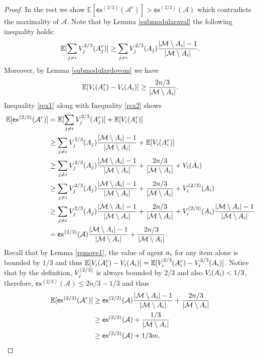 \begin{proof}
	In the rest we show $\mathbb{E}[\mathsf{ex}^{(2/3)}(\mathcal{A}^r)] > \mathsf{ex}^{(2/3)}(\mathcal{A})$ which contradicts the maximality of $\mathcal{A}$. 
	Note that by Lemma \ref{submodularaval} the following inequality holds: 
	\begin{equation}\label{rex1}
	\mathbb{E}[\sum_{j\neq i} V_j^{2/3}(A^r_j)] \geq \sum_{j\neq i} V_j^{2/3}(A_j) \frac{|\mathcal{M} \setminus A_i| - 1}{|\mathcal{M} \setminus A_i|}.
	\end{equation}
	Moreover, by Lemma \ref{submodulardovom} we have 
	\begin{equation}\label{rex2}
	\mathbb{E}[V_i(A^r_i) - V_i(A_i)] \geq \frac{2n/3}{|\mathcal{M} \setminus A_i|}.
	\end{equation}
	Inequality \eqref{rex1} along with Inequality \eqref{rex2} shows
	\begin{equation}
	\begin{split}
	\mathbb{E}[\mathsf{ex}^{(2/3)}(\mathcal{A}^r)] &= \mathbb{E}[\sum_{j\neq i} V_j^{2/3}(A^r_j)] + \mathbb{E}[V_i(A^r_i)]\\
	&\geq \sum_{j\neq i} V_j^{2/3}(A_j) \frac{|\mathcal{M} \setminus A_i| - 1}{|\mathcal{M} \setminus A_i|} + \mathbb{E}[V_i(A^r_i)]\\
	&\geq \sum_{j\neq i} V_j^{2/3}(A_j) \frac{|\mathcal{M} \setminus A_i| - 1}{|\mathcal{M} \setminus A_i|} + \frac{2n/3}{|\mathcal{M} \setminus A_i|} + V_i(A_i)\\
	&\geq \sum_{j\neq i} V_j^{2/3}(A_j) \frac{|\mathcal{M} \setminus A_i| - 1}{|\mathcal{M} \setminus A_i|} + \frac{2n/3}{|\mathcal{M} \setminus A_i|} + V_i^{(2/3)}(A_i)\\
	&\geq \sum_{j\neq i} V_j^{2/3}(A_j) \frac{|\mathcal{M} \setminus A_i| - 1}{|\mathcal{M} \setminus A_i|} + \frac{2n/3}{|\mathcal{M} \setminus A_i|} + V_i^{(2/3)}(A_i)\frac{|\mathcal{M} \setminus A_i| - 1}{|\mathcal{M} \setminus A_i|}\\
	&=  \mathsf{ex}^{(2/3)}(\mathcal{A}) \frac{|\mathcal{M} \setminus A_i| - 1}{|\mathcal{M} \setminus A_i|} + \frac{2n/3}{|\mathcal{M} \setminus A_i|}.\\
	\end{split}
	\end{equation}
Recall that by Lemma \ref{remove1}, the value of agent $a_i$ for any item alone is bounded by $1/3$ and thus $\mathbb{E}[V_i(A^r_i) - V_i(A_i)] = \mathbb{E}[V^{2/3}_i(A^r_i) - V^{2/3}_i(A_i)]$. 
Notice that by the definition, $V_j^{(2/3)}$ is always bounded by $2/3$ and also $V_i(A_i) < 1/3$, therefore, $\mathsf{ex}^{(2/3)}(\mathcal{A}) \leq 2n/3-1/3$ and thus
\begin{equation}
\begin{split}
\mathbb{E}[\mathsf{ex}^{(2/3)}(\mathcal{A}^r)] &\geq  \mathsf{ex}^{(2/3)}(\mathcal{A}) \frac{|\mathcal{M} \setminus A_i| - 1}{|\mathcal{M} \setminus A_i|} + \frac{2n/3}{|\mathcal{M} \setminus A_i|}\\
&\geq \mathsf{ex}^{(2/3)}(\mathcal{A}) + \frac{1/3}{|\mathcal{M} \setminus A_i|}\\
&\geq \mathsf{ex}^{(2/3)}(\mathcal{A}) + 1/3m.
\end{split}
\end{equation}
\end{proof}

